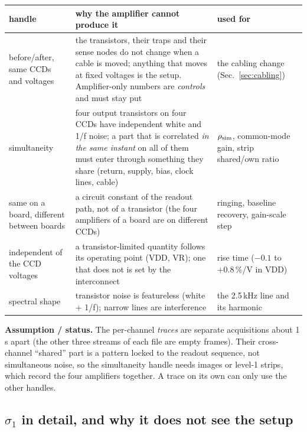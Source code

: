 \documentclass[10pt,a4paper]{article}
\newcommand{\caveat}[1]{\par\smallskip\noindent\colorbox{orange!10}{\parbox{\dimexpr\linewidth-2\fboxsep}{\small\textbf{Assumption / status.} #1}}\par\smallskip}
\begin{document}
\begin{center}\small
\begin{tabularx}{\linewidth}{@{}lXX@{}}\toprule
handle & why the amplifier cannot produce it & used for\\\midrule
before/after, same CCDs and voltages &
the transistors, their traps and their sense nodes do not change when a cable is moved; anything that moves at fixed
voltages is the setup. Amplifier-only numbers are \emph{controls} and must stay put &
the cabling change (Sec.~\ref{sec:cabling})\\
simultaneity &
four output transistors on four CCDs have independent white and 1/f noise; a part that is correlated \emph{in the same
instant} on all of them must enter through something they share (return, supply, bias, clock lines, cable) &
$\rho_{\rm sim}$, common-mode gain, strip shared/own ratio\\
same on a board, different between boards &
a circuit constant of the readout path, not of a transistor (the four amplifiers of a board are on different CCDs) &
ringing, baseline recovery, gain-scale step\\
independent of the CCD voltages &
a transistor-limited quantity follows its operating point (VDD, VR); one that does not is set by the interconnect &
rise time ($-0.1$ to $+0.8$\,\%/V in VDD)\\
spectral shape &
transistor noise is featureless (white + 1/f); narrow lines are interference &
the 2.5\,kHz line and its harmonic\\\bottomrule
\end{tabularx}
\end{center}
\caveat{The per-channel \emph{traces} are separate acquisitions about 1\,s apart (the other three streams of each file
are empty frames). Their cross-channel ``shared'' part is a pattern locked to the readout sequence, not simultaneous
noise, so the simultaneity handle needs images or level-1 strips, which record the four amplifiers together. A trace on
its own can only use the other handles.}

\subsection{$\sigma_1$ in detail, and why it does not see the setup}\label{sec:sigma1}
\end{document}
